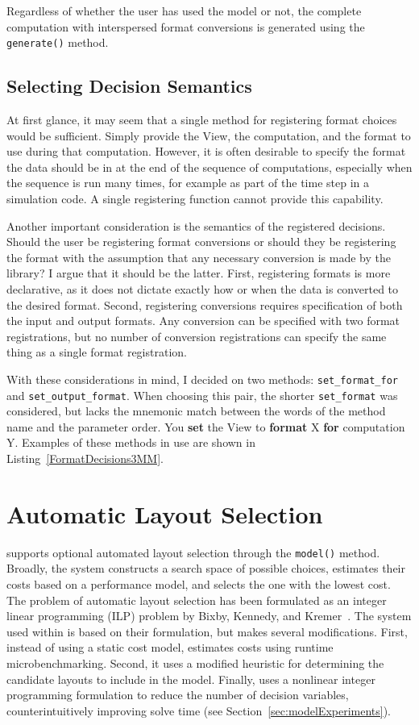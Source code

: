 Regardless of whether the user has used the model or not, 
the complete computation with interspersed format conversions is generated using the \verb.generate(). method.

\subsection{Selecting Decision Semantics}

At first glance, it may seem that a single method for registering format choices would be sufficient. 
Simply provide the View, the computation, and the format to use during that computation.
However, it is often desirable to specify the format the data should be in at the end of the sequence of computations, especially when the sequence is run many times, for example as part of the time step in a simulation code.
A single registering function cannot provide this capability. 

Another important consideration is the semantics of the registered decisions. 
Should the user be registering format conversions or should they be registering the format with the assumption that any necessary conversion is made by the library?
I argue that it should be the latter.
First, registering formats is more declarative, as it does not dictate exactly how or when the data is converted to the desired format.
Second, registering conversions requires specification of both the input and output formats. 
Any conversion can be specified with two format registrations, but no number of conversion registrations can specify the same thing as a single format registration.

With these considerations in mind, I decided on two methods: \verb.set_format_for. and \verb.set_output_format..
When choosing this pair, the shorter \verb.set_format. was considered, but lacks the mnemonic match between the words of the method name and the parameter order. You \textbf{set} the View to \textbf{format} X \textbf{for} computation Y. 
Examples of these methods in use are shown in Listing~\ref{FormatDecisions3MM}.


\section{Automatic Layout Selection}

\FormatDecisions{} supports optional automated layout selection through the \verb.model(). method.
Broadly, the system constructs a search space of possible choices, estimates their costs based on a performance model, and selects the one with the lowest cost.
The problem of automatic layout selection has been formulated as an integer linear programming (ILP) problem by Bixby, Kennedy, and Kremer~\cite{bixby1994automatic}.
The system used within \FormatDecisions{} is based on their formulation, but makes several modifications.
First, instead of using a static cost model, \FormatDecisions{} estimates costs using runtime microbenchmarking.
Second, it uses a modified heuristic for determining the candidate layouts to include in the model.
Finally, \FormatDecisions{} uses a nonlinear integer programming formulation to reduce the number of decision variables, counterintuitively improving solve time (see Section~\ref{sec:modelExperiments}).

